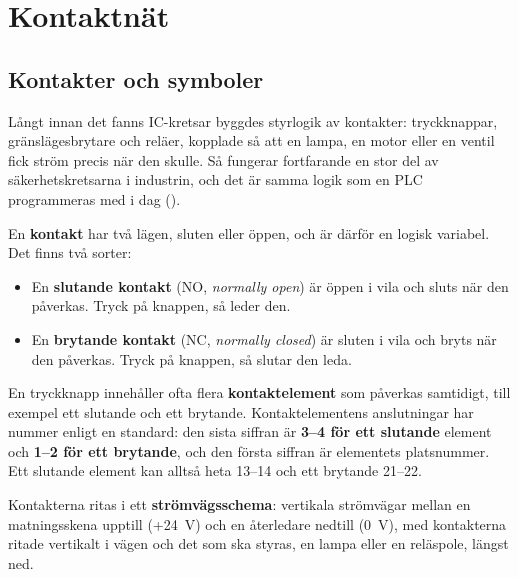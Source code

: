 %

\section{Kontaktnät}
\label{c2:app:b}

\subsection{Kontakter och symboler}
\label{c2:b1}
Långt innan det fanns IC-kretsar byggdes styrlogik av kontakter: tryckknappar, gränslägesbrytare
och reläer, kopplade så att en lampa, en motor eller en ventil fick ström precis när den skulle. Så
fungerar fortfarande en stor del av säkerhetskretsarna i industrin, och det är samma logik som en
PLC programmeras med i dag ().

En \textbf{kontakt} har två lägen, sluten eller öppen, och är därför en logisk variabel. Det finns
två sorter:
\begin{itemize}
  \item En \textbf{slutande kontakt} (NO, \emph{normally open}) är öppen i vila och sluts när den
    påverkas. Tryck på knappen, så leder den.
  \item En \textbf{brytande kontakt} (NC, \emph{normally closed}) är sluten i vila och bryts när
    den påverkas. Tryck på knappen, så slutar den leda.
\end{itemize}

En tryckknapp innehåller ofta flera \textbf{kontaktelement} som påverkas samtidigt, till exempel
ett slutande och ett brytande. Kontaktelementens anslutningar har nummer enligt en standard: den
sista siffran är \textbf{3--4 för ett slutande} element och \textbf{1--2 för ett brytande}, och den
första siffran är elementets platsnummer. Ett slutande element kan alltså heta 13--14 och ett
brytande 21--22.

Kontakterna ritas i ett \textbf{strömvägsschema}: vertikala strömvägar mellan en matningsskena
upptill (+24~V) och en återledare nedtill (0~V), med kontakterna ritade vertikalt i vägen och det
som ska styras, en lampa eller en reläspole, längst ned.


